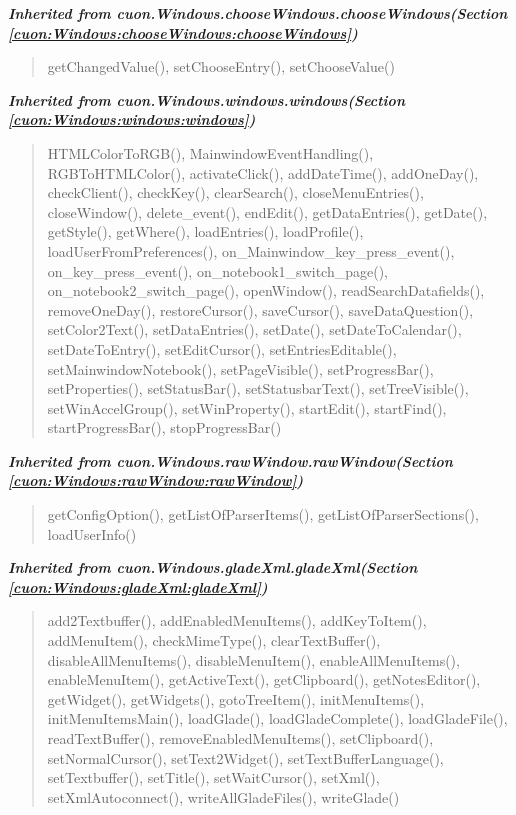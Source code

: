 \large{\textbf{\textit{Inherited from cuon.Windows.chooseWindows.chooseWindows\textit{(Section \ref{cuon:Windows:chooseWindows:chooseWindows})}}}}

\begin{quote}
getChangedValue(), setChooseEntry(), setChooseValue()
\end{quote}

\large{\textbf{\textit{Inherited from cuon.Windows.windows.windows\textit{(Section \ref{cuon:Windows:windows:windows})}}}}

\begin{quote}
HTMLColorToRGB(), MainwindowEventHandling(), RGBToHTMLColor(), activateClick(), addDateTime(), addOneDay(), checkClient(), checkKey(), clearSearch(), closeMenuEntries(), closeWindow(), delete\_event(), endEdit(), getDataEntries(), getDate(), getStyle(), getWhere(), loadEntries(), loadProfile(), loadUserFromPreferences(), on\_Mainwindow\_key\_press\_event(), on\_key\_press\_event(), on\_notebook1\_switch\_page(), on\_notebook2\_switch\_page(), openWindow(), readSearchDatafields(), removeOneDay(), restoreCursor(), saveCursor(), saveDataQuestion(), setColor2Text(), setDataEntries(), setDate(), setDateToCalendar(), setDateToEntry(), setEditCursor(), setEntriesEditable(), setMainwindowNotebook(), setPageVisible(), setProgressBar(), setProperties(), setStatusBar(), setStatusbarText(), setTreeVisible(), setWinAccelGroup(), setWinProperty(), startEdit(), startFind(), startProgressBar(), stopProgressBar()
\end{quote}

\large{\textbf{\textit{Inherited from cuon.Windows.rawWindow.rawWindow\textit{(Section \ref{cuon:Windows:rawWindow:rawWindow})}}}}

\begin{quote}
getConfigOption(), getListOfParserItems(), getListOfParserSections(), loadUserInfo()
\end{quote}

\large{\textbf{\textit{Inherited from cuon.Windows.gladeXml.gladeXml\textit{(Section \ref{cuon:Windows:gladeXml:gladeXml})}}}}

\begin{quote}
add2Textbuffer(), addEnabledMenuItems(), addKeyToItem(), addMenuItem(), checkMimeType(), clearTextBuffer(), disableAllMenuItems(), disableMenuItem(), enableAllMenuItems(), enableMenuItem(), getActiveText(), getClipboard(), getNotesEditor(), getWidget(), getWidgets(), gotoTreeItem(), initMenuItems(), initMenuItemsMain(), loadGlade(), loadGladeComplete(), loadGladeFile(), readTextBuffer(), removeEnabledMenuItems(), setClipboard(), setNormalCursor(), setText2Widget(), setTextBufferLanguage(), setTextbuffer(), setTitle(), setWaitCursor(), setXml(), setXmlAutoconnect(), writeAllGladeFiles(), writeGlade()
\end{quote}

